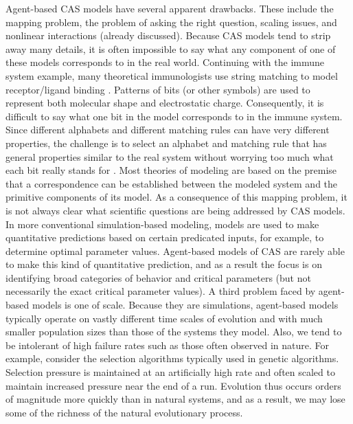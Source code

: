 Agent-based CAS models have several apparent drawbacks.  These include
the mapping problem, the problem of asking the right question, scaling
issues, and nonlinear interactions (already discussed).  Because CAS
models tend to strip away many details, it is often impossible to say
what any component of one of these models corresponds to in the real
world.  Continuing with the immune system example, many theoretical
immunologists use string matching to model receptor/ligand binding
\cite{PerelsonAndOster79}.  Patterns of bits (or other symbols) are
used to represent both molecular shape and electrostatic charge.
Consequently, it is difficult to say what one bit in the model
corresponds to in the immune system.  Since different alphabets and
different matching rules can have very different properties, the
challenge is to select an alphabet and matching rule that has general
properties similar to the real system without worrying too much what
each bit really stands for \cite{Smith94a}.  Most theories of modeling
are based on the premise that a correspondence can be established
between the modeled system and the primitive components of its model.
As a consequence of this mapping problem, it is not always clear what
scientific questions are being addressed by CAS models.  In more
conventional simulation-based modeling, models are used to make
quantitative predictions based on certain predicated inputs, for
example, to determine optimal parameter values.  Agent-based models of
CAS are rarely able to make this kind of quantitative prediction, and
as a result the focus is on identifying broad categories of behavior
and critical parameters (but not necessarily the exact critical
parameter values).  A third problem faced by agent-based models is one
of scale.  Because they are simulations, agent-based models typically
operate on vastly different time scales of evolution and with much
smaller population sizes than those of the systems they model.  Also,
we tend to be intolerant of high failure rates such as those often
observed in nature.  For example, consider the selection algorithms
typically used in genetic algorithms.  Selection pressure is
maintained at an artificially high rate and often scaled to maintain
increased pressure near the end of a run.  Evolution thus occurs
orders of magnitude more quickly than in natural systems, and as a
result, we may lose some of the richness of the natural evolutionary
process.

